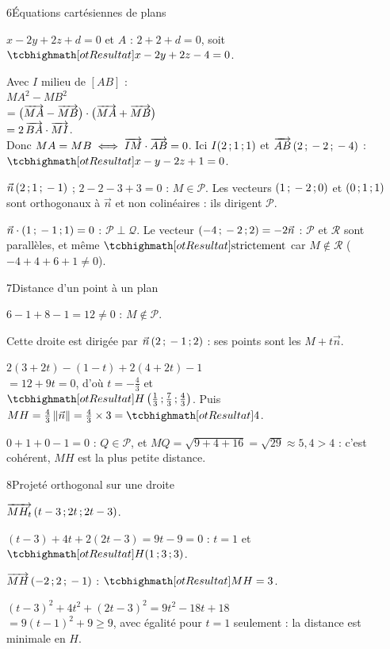 \begin{deuxcolonnes}
\begin{corrige}{6}{Équations cartésiennes de plans}
\begin{questions}
  \item $x-2y+2z+d=0$ et $A$ : $2+2+d=0$, soit $\res{x-2y+2z-4=0}$.
  \item Avec $I$ milieu de $[AB]$ :\\ $MA^2-MB^2$\\ $=\big(\overrightarrow{MA}-\overrightarrow{MB}\big)\cdot\big(\overrightarrow{MA}+\overrightarrow{MB}\big)$\\
    $=2\,\overrightarrow{BA}\cdot\overrightarrow{MI}$.\\ Donc $MA=MB\iff\overrightarrow{IM}\cdot\overrightarrow{AB}=0$. Ici $I(2\,{;}\,1\,{;}\,1)$ et $\overrightarrow{AB}\,(2\,{;}\,-2\,{;}\,-4)$ :
    $\res{x-y-2z+1=0}$.
  \item $\vec n\,(2\,{;}\,1\,{;}\,-1)$ ; $2-2-3+3=0$ : $M\in\mathcal{P}$. Les vecteurs $(1\,{;}\,-2\,{;}\,0)$ et $(0\,{;}\,1\,{;}\,1)$ sont orthogonaux à
    $\vec n$ et non colinéaires : ils dirigent $\mathcal{P}$.
  \item $\vec n\cdot(1\,{;}\,-1\,{;}\,1)=0$ : $\mathcal{P}\perp\mathcal{Q}$. Le vecteur $(-4\,{;}\,-2\,{;}\,2)=-2\vec n$ : $\mathcal{P}$ et
    $\mathcal{R}$ sont parallèles, et même $\res{\text{strictement}}$ car $M\notin\mathcal{R}$ ($-4+4+6+1\neq0$).
\end{questions}
\end{corrige}

\begin{corrige}{7}{Distance d'un point à un plan}
\begin{questions}
  \item $6-1+8-1=12\neq0$ : $M\notin\mathcal{P}$.
  \item Cette droite est dirigée par $\vec n\,(2\,{;}\,-1\,{;}\,2)$ : ses points sont les $M+t\vec n$.
  \item $2(3+2t)-(1-t)+2(4+2t)-1$\\ $=12+9t=0$, d'où $t=-\frac43$ et\\ $\res{H\left(\tfrac13\pv\tfrac73\pv\tfrac43\right)}$.
    Puis $MH=\frac43\norme{\vec n}=\frac43\times3=\res{4}$.
  \item $0+1+0-1=0$ : $Q\in\mathcal{P}$, et $MQ=\sqrt{9+4+16}=\sqrt{29}\approx5{,}4>4$ : c'est cohérent, $MH$ est la plus petite
    distance.
\end{questions}
\end{corrige}

\begin{corrige}{8}{Projeté orthogonal sur une droite}
\begin{questions}
  \item $\overrightarrow{MH_t}\,(t-3\,{;}\,2t\,{;}\,2t-3)$.
  \item $(t-3)+4t+2(2t-3)=9t-9=0$ : $t=1$ et $\res{H(1\pv3\pv3)}$.
  \item $\overrightarrow{MH}\,(-2\,{;}\,2\,{;}\,-1)$ : $\res{MH=3}$.
  \item $(t-3)^2+4t^2+(2t-3)^2=9t^2-18t+18$\\ $=9(t-1)^2+9\geq9$, avec égalité pour $t=1$ seulement : la distance est minimale en $H$.
\end{questions}
\end{corrige}


\end{deuxcolonnes}
